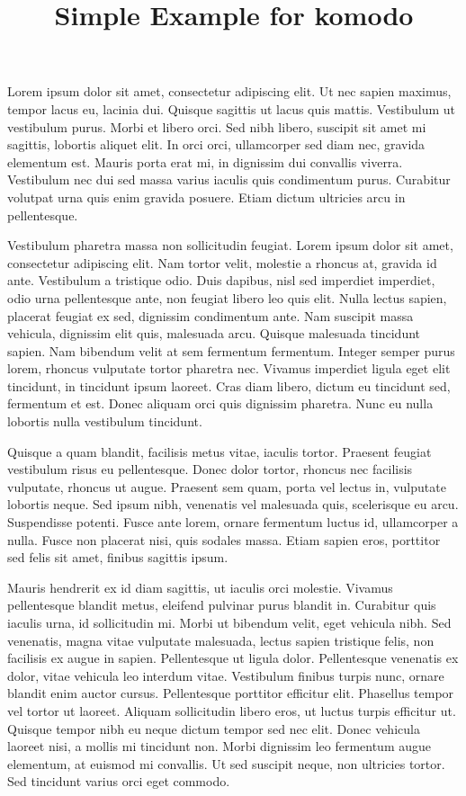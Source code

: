\documentclass[12pt]{article}
\title{Simple Example for komodo}
\begin{document}
Lorem ipsum dolor sit amet, consectetur adipiscing elit. Ut nec sapien maximus, tempor lacus eu, lacinia dui. Quisque sagittis ut lacus quis mattis. Vestibulum ut vestibulum purus. Morbi et libero orci. Sed nibh libero, suscipit sit amet mi sagittis, lobortis aliquet elit. In orci orci, ullamcorper sed diam nec, gravida elementum est. Mauris porta erat mi, in dignissim dui convallis viverra. Vestibulum nec dui sed massa varius iaculis quis condimentum purus. Curabitur volutpat urna quis enim gravida posuere. Etiam dictum ultricies arcu in pellentesque.

Vestibulum pharetra massa non sollicitudin feugiat. Lorem ipsum dolor sit amet, consectetur adipiscing elit. Nam tortor velit, molestie a rhoncus at, gravida id ante. Vestibulum a tristique odio. Duis dapibus, nisl sed imperdiet imperdiet, odio urna pellentesque ante, non feugiat libero leo quis elit. Nulla lectus sapien, placerat feugiat ex sed, dignissim condimentum ante. Nam suscipit massa vehicula, dignissim elit quis, malesuada arcu. Quisque malesuada tincidunt sapien. Nam bibendum velit at sem fermentum fermentum. Integer semper purus lorem, rhoncus vulputate tortor pharetra nec. Vivamus imperdiet ligula eget elit tincidunt, in tincidunt ipsum laoreet. Cras diam libero, dictum eu tincidunt sed, fermentum et est. Donec aliquam orci quis dignissim pharetra. Nunc eu nulla lobortis nulla vestibulum tincidunt.

Quisque a quam blandit, facilisis metus vitae, iaculis tortor. Praesent feugiat vestibulum risus eu pellentesque. Donec dolor tortor, rhoncus nec facilisis vulputate, rhoncus ut augue. Praesent sem quam, porta vel lectus in, vulputate lobortis neque. Sed ipsum nibh, venenatis vel malesuada quis, scelerisque eu arcu. Suspendisse potenti. Fusce ante lorem, ornare fermentum luctus id, ullamcorper a nulla. Fusce non placerat nisi, quis sodales massa. Etiam sapien eros, porttitor sed felis sit amet, finibus sagittis ipsum.

Mauris hendrerit ex id diam sagittis, ut iaculis orci molestie. Vivamus pellentesque blandit metus, eleifend pulvinar purus blandit in. Curabitur quis iaculis urna, id sollicitudin mi. Morbi ut bibendum velit, eget vehicula nibh. Sed venenatis, magna vitae vulputate malesuada, lectus sapien tristique felis, non facilisis ex augue in sapien. Pellentesque ut ligula dolor. Pellentesque venenatis ex dolor, vitae vehicula leo interdum vitae. Vestibulum finibus turpis nunc, ornare blandit enim auctor cursus. Pellentesque porttitor efficitur elit. Phasellus tempor vel tortor ut laoreet. Aliquam sollicitudin libero eros, ut luctus turpis efficitur ut. Quisque tempor nibh eu neque dictum tempor sed nec elit. Donec vehicula laoreet nisi, a mollis mi tincidunt non. Morbi dignissim leo fermentum augue elementum, at euismod mi convallis. Ut sed suscipit neque, non ultricies tortor. Sed tincidunt varius orci eget commodo.
\end{document}
